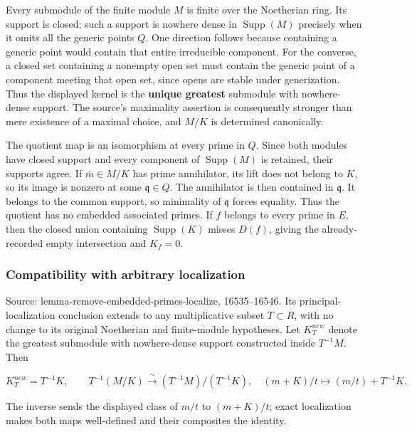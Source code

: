 Every submodule of the finite module \(M\) is finite over the Noetherian ring. Its support is closed; such a support is nowhere dense in \(\operatorname{Supp}(M)\) precisely when it omits all the generic points \(Q\). One direction follows because containing a generic point would contain that entire irreducible component. For the converse, a closed set containing a nonempty open set must contain the generic point of a component meeting that open set, since opens are stable under generization. Thus the displayed kernel is the \textbf{unique greatest} submodule with nowhere-dense support. The source's maximality assertion is consequently stronger than mere existence of a maximal choice, and \(M/K\) is determined canonically.

The quotient map is an isomorphism at every prime in \(Q\). Since both modules have closed support and every component of \(\operatorname{Supp}(M)\) is retained, their supports agree. If \(\bar m\in M/K\) has prime annihilator, its lift does not belong to \(K\), so its image is nonzero at some \(\mathfrak q\in Q\). The annihilator is then contained in \(\mathfrak q\). It belongs to the common support, so minimality of \(\mathfrak q\) forces equality. Thus the quotient has no embedded associated primes. If \(f\) belongs to every prime in \(E\), then the closed union containing \(\operatorname{Supp}(K)\) misses \(D(f)\), giving the already-recorded empty intersection and \(K_f=0\).

\subsubsection{Compatibility with arbitrary localization}\label{algebra-proof-006-compatibility-with-arbitrary-localization}

Source: lemma-remove-embedded-primes-localize, 16535--16546. Its principal-localization conclusion extends to any multiplicative subset \(T\subset R\), with no change to its original Noetherian and finite-module hypotheses. Let \(K_T^{new}\) denote the greatest submodule with nowhere-dense support constructed inside \(T^{-1}M\). Then

\[
K_T^{new}=T^{-1}K,\qquad
T^{-1}(M/K)\xrightarrow{\;\sim\;}(T^{-1}M)/(T^{-1}K),
\quad (m+K)/t\longmapsto(m/t)+T^{-1}K.
\]

The inverse sends the displayed class of \(m/t\) to \((m+K)/t\); exact localization makes both maps well-defined and their composites the identity.


